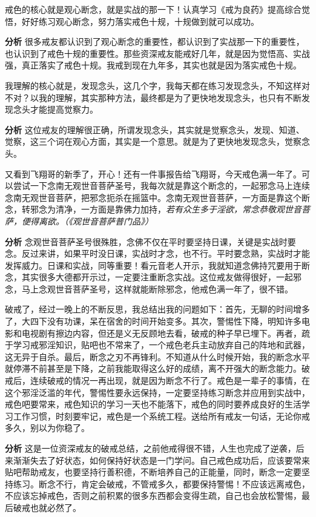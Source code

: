 \begin{case}
    戒色的核心就是观心断念，就是实战的那一下！认真学习《戒为良药》提高综合觉悟，好好练习观心断念，努力落实戒色十规，十规做到就可以成功。

    \textbf{分析} 很多戒友都认识到了观心断念的重要性，都认识到了实战那一下的重要性，也认识到了戒色十规的重要性。那些资深戒友能戒好几年，就是因为觉悟高、实战强，真正落实了戒色十规。我戒到现在九年多，其实也就是因为落实戒色十规。
\end{case}

\begin{case}
    我理解的核心就是，发现念头，这几个字，我每天都在练习发现念头，不知这样对不对？以我的理解，其实那种方法，最终都是为了更快地发现念头，也只有不断发现念头才能提高觉察力。

    \textbf{分析} 这位戒友的理解很正确，所谓发现念头，其实就是觉察念头，发现、知道、觉察，这三个词在观心方面，其实是一个意思。就是为了更快地发现念头，觉察念头。
\end{case}

\begin{case}
    又看到飞翔哥的新季了，开心！还有一件事报告给飞翔哥，今天戒色满一年了。可以尝试一下念南无观世音菩萨圣号，我每次就是靠这个断念的，一起邪念马上连续念南无观世音菩萨，把邪念扼杀在摇篮中。念南无观世音菩萨，一方面是靠这个断念，转邪念为清净，一方面是靠佛力加持，\textit{若有众生多于淫欲，常念恭敬观世音菩萨，便得离欲。（《观世音菩萨普门品》）}

    \textbf{分析} 念观世音菩萨圣号很殊胜，念佛不仅在平时要坚持日课，关键是实战时要念。反过来讲，如果平时没日课，实战时才念，也不行。平时要念熟，实战时才能发挥威力。日课和实战，同等重要！看元音老人开示，我就知道念佛持咒要用于断念，其实很多大德都开示过，一定要注重断念实战。这位戒友做得很好，一起邪念，马上念观世音菩萨圣号，这样就能断除邪念，他戒色满一年了，很不错。
\end{case}

\begin{case}
    破戒了，经过一晚上的不断反思，我总结出我的问题如下：首先，无聊的时间增多了，大四下没有功课，呆在宿舍的时间开始变多。其次，警惕性下降，明知许多电影和电视剧有擦边内容，但还是义无反顾地去看，破戒的种子早已埋下。再者，疏于学习戒邪淫知识，贴吧也不常来了，一个戒色老兵主动放弃自己的阵地和武器，这无异于自杀。最后，断念之刃不再锋利。不知道从什么时候开始，我的断念水平就停滞不前甚至是下降，之前我能取得这么好的成绩，离不开强大的断念能力。破戒后，连续破戒的情况一再出现，就是因为断念不行了。戒色是一辈子的事情，在这个邪淫泛滥的年代，警惕性要永远保持，一定要坚持练习断念并应用到实战中，戒色吧要常来，戒色知识的学习一天也不能落下，戒色的同时要养成良好的生活学习工作习惯，时刻要牢记，戒色是一个系统工程。送给所有戒友一句话，无论你戒多久，别以为你稳了。

    \textbf{分析} 这是一位资深戒友的破戒总结，之前他戒得很不错，人生也完成了逆袭，后来渐渐失去了好状态，如何保持好状态是一门学问。自己戒色成功后，应该要常来贴吧帮助戒友，也要坚持行善积德，不断培养自己的正能量，同时，断念一定要坚持练习。断念不行，肯定会破戒，不管戒多久，都要保持警惕！不应该远离戒色，不应该忘掉戒色，否则之前积累的很多东西都会变得生疏，自己也会放松警惕，最后破戒也就必然了。
\end{case}

